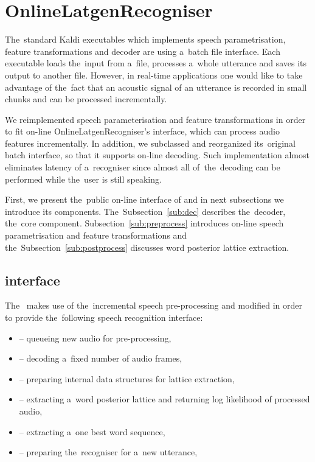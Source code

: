 \section{OnlineLatgenRecogniser}
\label{sec:rec}

The~standard Kaldi executables which implements speech parametrisation, feature transformations and decoder are using a~batch file interface.
Each executable loads the~input from a~file, processes a~whole utterance and saves its output to another file.
However, in real-time applications one would like to take advantage of the~fact that an acoustic signal of an utterance is recorded in small chunks and can be processed incrementally.

We reimplemented speech parameterisation and feature transformations in order to fit on-line OnlineLatgenRecogniser's interface, which can process audio features incrementally.
In addition, we subclassed  and reorganized its~original batch interface, so that it supports on-line decoding.
Such implementation almost eliminates latency of a~recogniser since almost all of~the~decoding can be performed while the~user is still speaking.

First, we present the~public on-line interface of  and in next subsections we introduce its components.
The~Subsection~\ref{sub:dec} describes the~decoder, the~core component.
Subsection~\ref{sub:preprocess} introduces on-line speech parametrisation and feature transformations and the~Subsection~\ref{sub:postprocess} discusses word posterior lattice extraction.

\subsection{ interface}
\label{sub:verb_c_}
The~ makes use of the~incremental speech pre-processing and modified  in order to provide the~following speech recognition interface:
\begin{itemize}
\item {} -- queueing new audio for pre-processing,
\item {} -- decoding a~fixed number of audio frames,
\item {} -- preparing internal data structures for lattice extraction,
\item {} -- extracting a~word posterior lattice and returning log likelihood of processed audio,
\item {} -- extracting a~one best word sequence,
\item {} -- preparing the~recogniser for a~new utterance,
\end{itemize}

